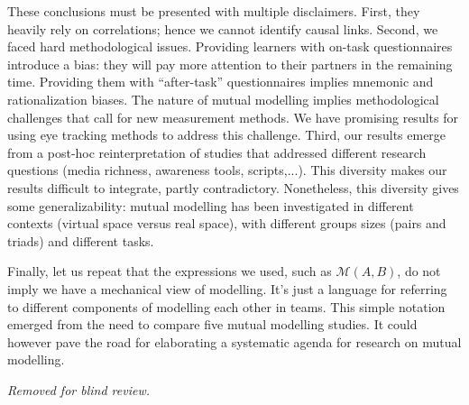 \documentclass[natbib]{svjour3}
\newcommand{\gmodel}[2]{{$\mathcal{M}(#1, #2)$}}
\begin{document}
These conclusions must be presented with multiple disclaimers. First, they
heavily rely on correlations; hence we cannot identify causal links. Second, we
faced hard methodological issues. Providing learners with on-task questionnaires
introduce a bias: they will pay more attention to their partners in the
remaining time. Providing them with ``after-task'' questionnaires implies mnemonic
and rationalization biases. The nature of mutual modelling implies methodological
challenges that call for new  measurement methods. We have promising results for
using eye tracking methods to address this challenge. 
Third, our results emerge from a post-hoc reinterpretation of studies
that addressed different research questions (media richness, awareness tools,
scripts,...). This diversity makes our results difficult to integrate, partly
contradictory. Nonetheless, this diversity gives some generalizability: mutual
modelling has been investigated in different contexts (virtual space versus real
space), with different groups sizes (pairs and triads) and different tasks.

Finally, let us repeat that the expressions we used, such as \gmodel{A}{B}, do
not imply we have a mechanical view of modelling. It's just a language for
referring to different components of modelling each other in teams.  This simple
notation emerged from the need to compare five mutual modelling studies. It
could however pave the road for elaborating a systematic agenda for research on
mutual modelling.

\begin{acknowledgements}


\textit{Removed for blind review.}

\end{acknowledgements}



\end{document}

